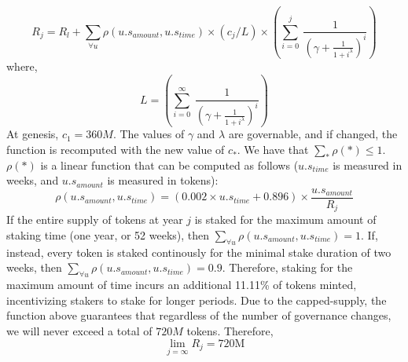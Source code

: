 \documentclass[runningheads]{llncs}
\newcommand\ddfrac[2]{\frac{\displaystyle #1}{\displaystyle #2}}
\begin{document}
\begin{equation}
R_j = R_{l} + \sum_{\forall u} \rho(u.s_{amount}, u.s_{time}) \times (c_j/L) \times \left(\sum\limits_{i=0}^{j}\ \ddfrac{1}{\left(\gamma + \ddfrac{1}{1 + i^{\lambda}}\right)^i} \right)
\label{eq:minting-function}
\end{equation}
where, 
\begin{equation}
L = \left(\sum\limits_{i=0}^{\infty}\ \ddfrac{1}{\left(\gamma + \ddfrac{1}{1 + i^{\lambda}}\right)^i}\right)
\end{equation}
At genesis, $c_1 = 360M$. The values of $\gamma$ and $\lambda$ are governable, and if changed, the function is recomputed with the new value of $c_{*}$. We have that $\sum_{*} \rho(*) \leq 1$. $\rho(*)$ is a linear function that can be computed as follows ($u.s_{time}$ is measured in weeks, and $u.s_{amount}$ is measured in \AVATokenName{} tokens): 
\begin{equation}
\rho(u.s_{amount}, u.s_{time}) = (0.002\times u.s_{time} + 0.896) \times \frac{u.s_{amount}}{R_j}
\end{equation}
If the entire supply of tokens at year $j$ is staked for the maximum amount of staking time (one year, or 52 weeks), then $\sum_{\forall u} \rho(u.s_{amount}, u.s_{time}) = 1$. If, instead, every token is staked continously for the minimal stake duration of two weeks, then $\sum_{\forall u} \rho(u.s_{amount}, u.s_{time}) = 0.9$. Therefore, staking for the maximum amount of time incurs an additional 11.11\% of tokens minted, incentivizing stakers to stake for longer periods. Due to the capped-supply, the function above guarantees that regardless of the number of governance changes, we will never exceed a total of $720M$ tokens. Therefore, 
\begin{equation}
    \lim_{j = \infty} R_j = \text{720M}
\end{equation}
\end{document}
